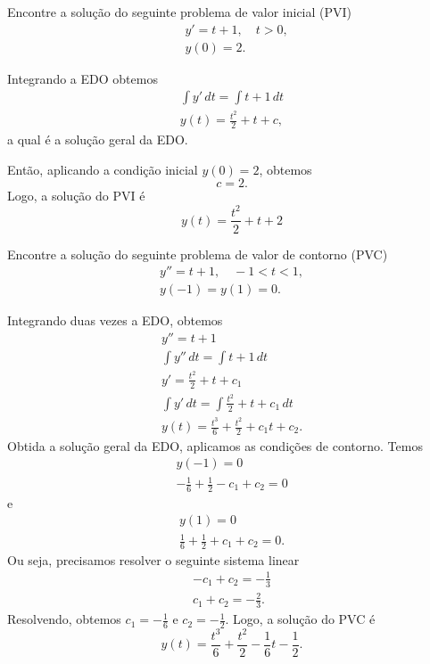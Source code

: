 \begin{exeresol}
  Encontre a solução do seguinte problema de valor inicial (PVI)
  \begin{align}
    &y' = t + 1,\quad t>0,\\
    &y(0) = 2.
  \end{align}
\end{exeresol}
\begin{resol}
  Integrando a EDO obtemos
  \begin{gather}
    \int y'\,dt = \int t+1\,dt\\
    y(t) = \frac{t^2}{2} + t + c,
  \end{gather}
  a qual é a solução geral da EDO.

  Então, aplicando a condição inicial $y(0) = 2$, obtemos
  \begin{equation}
    c = 2.
  \end{equation}
  Logo, a solução do PVI é
  \begin{equation}
    y(t) = \frac{t^2}{2} + t + 2
  \end{equation}

\end{resol}

\begin{exeresol}
  Encontre a solução do seguinte problema de valor de contorno (PVC)
  \begin{gather}
    y'' = t + 1,\quad -1 < t < 1, \\
    y(-1) = y(1) = 0.
  \end{gather}
\end{exeresol}
\begin{resol}
  Integrando duas vezes a EDO, obtemos
  \begin{gather}
    y'' = t + 1\\
    \int y''\,dt = \int t+1\,dt \\
    y' = \frac{t^2}{2} + t + c_1 \\
    \int y'\,dt = \int \frac{t^2}{2} + t + c_1 \,dt \\
    y(t) =  \frac{t^3}{6} + \frac{t^2}{2} + c_1t + c_2.
  \end{gather}
  Obtida a solução geral da EDO, aplicamos as condições de contorno. Temos
  \begin{gather}
    y(-1) = 0 \\
    -\frac{1}{6} + \frac{1}{2} - c_1 + c_2 = 0
  \end{gather}
  e
  \begin{gather}
    y(1) = 0 \\
    \frac{1}{6} + \frac{1}{2} + c_1 + c_2 = 0.
  \end{gather}
  Ou seja, precisamos resolver o seguinte sistema linear
  \begin{align}
    -c_1 + c_2 = -\frac{1}{3} \\
    c_1 + c_2 = -\frac{2}{3}.
  \end{align}
  Resolvendo, obtemos $c_1 = -\frac{1}{6}$ e $c_2 = -\frac{1}{2}$. Logo, a solução do PVC é
  \begin{equation}
    y(t) = \frac{t^3}{6} + \frac{t^2}{2} - \frac{1}{6}t - \frac{1}{2}.
  \end{equation}
\end{resol}

